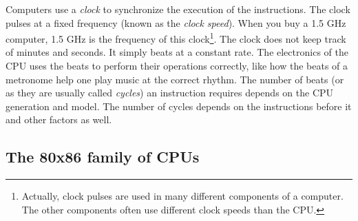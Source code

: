 Computers use a \emph{clock}  to synchronize the
execution of the  instructions.  The clock pulses at a fixed frequency
(known as the \emph{clock speed}). When you buy a 1.5 GHz computer,
1.5 GHz is the frequency of this clock\footnote{Actually, clock pulses
are used in many different components of a computer. The other
components often use different clock speeds than the CPU.}. The clock
does not keep track of minutes and seconds. It simply beats at a
constant rate. The electronics of the CPU uses the beats to perform
their operations correctly, like how the beats of a metronome help one
play music at the correct rhythm.  The number of beats (or as they are
usually called \emph{cycles}) an instruction requires depends on the
CPU generation and model. The number of cycles depends on the
instructions before it and other factors as well.


\subsection{The 80x86 family of CPUs}

